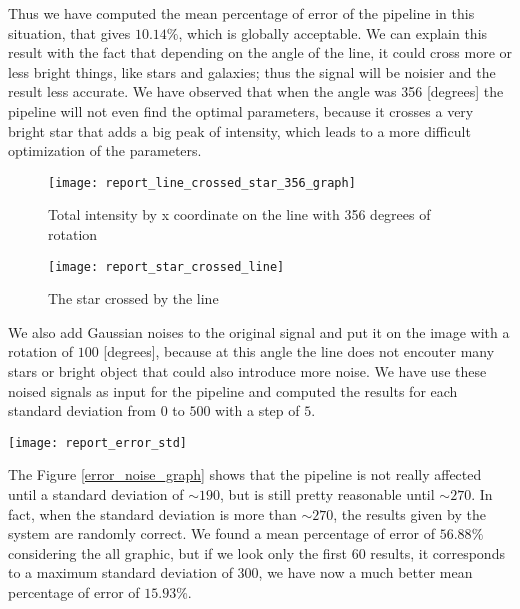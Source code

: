 \documentclass[a4paper,12pt,oneside]{report}
\begin{document}
Thus we have computed the mean percentage of error of the pipeline in this situation, that gives $10.14 \%$, which is globally acceptable. We can 
explain this result with the fact that depending on the angle of the line, it could cross more or less bright things, like stars and galaxies;
thus the signal will be noisier and the result less accurate. We have observed that when the angle was 356 [degrees] the pipeline will not
even find the optimal parameters, because it crosses a very bright star that adds a big peak of intensity, which leads to a more difficult
optimization of the parameters.
\begin{figure}[h]
    \begin{minipage}[c]{.47\linewidth}
        \centering
        \texttt{[image: report\_line\_crossed\_star\_356\_graph]}
        \caption{Total intensity by x coordinate on the line with 356 degrees of rotation}
        \label{graphRotated356Line}
    \end{minipage}
    \hfill
    \begin{minipage}[c]{.47\linewidth}
        \centering
        \texttt{[image: report\_star\_crossed\_line]}
        \caption{The star crossed by the line}
    \end{minipage}
\end{figure}

We also add Gaussian noises to the original signal and put it on the image with a rotation of $100$ [degrees], because at this angle the line
does not encouter many stars or bright object that could also introduce more noise. We have use these noised signals as input for the pipeline 
and computed the results for each standard deviation from $0$ to $500$ with a step of $5$.
\begin{center}
    \texttt{[image: report\_error\_std]}
    \label{error_noise_graph}
\end{center}
The Figure \ref{error_noise_graph} shows that the pipeline is not really affected until a standard deviation of $\sim 190$, but is still 
pretty reasonable until $\sim 270$. In fact, when the standard deviation is more than $\sim 270$, the results given by the system are 
randomly correct. We found a mean percentage of error of $56.88 \%$ considering the all graphic, but if we look only the first $60$ results,
it corresponds to a maximum standard deviation of $300$, we have now a much better mean percentage of error of $15.93 \%$.
\end{document}
